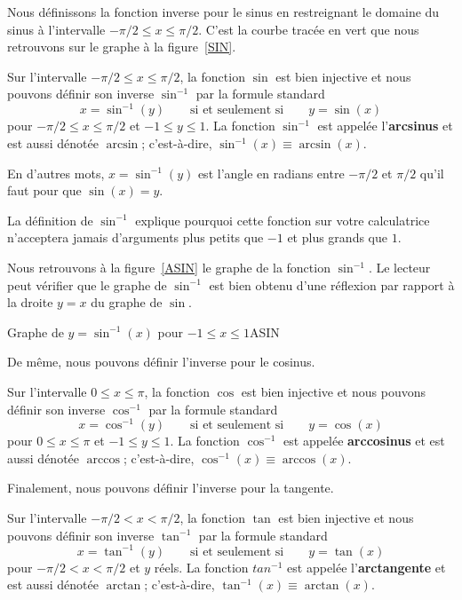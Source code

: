 {Nous définissons la fonction inverse pour le sinus en restreignant le
domaine du sinus à l'intervalle $-\pi/2 \leq x \leq \pi/2$.  C'est la
courbe tracée en vert que nous retrouvons sur le graphe
à la figure~\ref{SIN}.

\begin{defn} 
Sur l'intervalle $-\pi/2 \leq x \leq \pi/2$, la fonction $\sin$ est
bien injective et nous pouvons définir son inverse $\sin^{-1}$ par la
formule standard
\[
x = \sin^{-1}(y) \qquad \text{si et seulement si} \qquad y = \sin(x)
\]
pour $-\pi/2 \leq x \leq \pi/2$ et $-1 \leq y \leq 1$.  La fonction
$\sin^{-1}$ est appelée l'{\bfseries arcsinus} et est
aussi dénotée $\arcsin$; c'est-à-dire, $\sin^{-1}(x) \equiv \arcsin(x)$.
\end{defn}

En d'autres mots, $x = \sin^{-1}(y)$ est l'angle en radians entre
$-\pi/2$ et $\pi/2$ qu'il faut pour que $\sin(x) = y$.

La définition de $\sin^{-1}$ explique pourquoi cette fonction sur
votre calculatrice n'acceptera jamais d'arguments plus petits que $-1$
et plus grands que $1$.

Nous retrouvons à la figure~\ref{ASIN} le graphe de la fonction
$\sin^{-1}$.  Le lecteur peut vérifier que le graphe de $\sin^{-1}$
est bien obtenu d'une réflexion par rapport à la droite $y=x$ du
graphe de $\sin$.

{Graphe de $y=\sin^{-1}(x)$ pour $-1 \leq x \leq 1$}{ASIN}

De même, nous pouvons définir l'inverse pour le cosinus.

\begin{defn} 
Sur l'intervalle $0 \leq x \leq \pi$, la fonction $\cos$ est bien
injective et nous pouvons définir son inverse $\cos^{-1}$ par la formule
standard
\[
x = \cos^{-1}(y) \qquad \text{si et seulement si} \qquad y = \cos(x)
\]
pour $0 \leq x \leq \pi$ et $-1 \leq y \leq 1$.  La fonction
$\cos^{-1}$ est appelée {\bfseries arccosinus} et
est aussi dénotée $\arccos$; c'est-à-dire,
$\cos^{-1}(x) \equiv \arccos(x)$.
\end{defn}

Finalement, nous pouvons définir l'inverse pour la tangente.

\begin{defn} 
Sur l'intervalle $-\pi/2 < x < \pi/2$,  la fonction $\tan$ est bien
injective et nous pouvons définir son inverse $\tan^{-1}$ par la formule
standard
\[
x = \tan^{-1}(y) \qquad \text{si et seulement si} \qquad y = \tan(x)
\]
pour $-\pi/2 < x < \pi/2$ et $y$ réels.  La fonction $tan^{-1}$ est
appelée l'{\bfseries arctangente} et est aussi
dénotée $\arctan$; c'est-à-dire, $\tan^{-1}(x) \equiv \arctan(x)$.
\end{defn}

}
